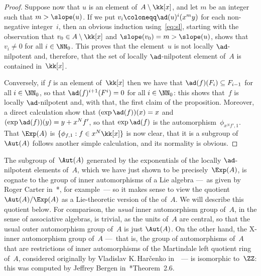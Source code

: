 \begin{proof}
Suppose now that $u$ is an element of~$A\setminus\kk[x]$, and let $m$ be an
integer such that $m>\slope(u)$. If we put $v_i\coloneqq\ad(u)^i(x^my)$ for
each non-negative integer~$i$, then an obvious induction
using~\eqref{eq:sl}, starting with the observation that $v_0\in
A\setminus\kk[x]$ and $\slope(v_0)=m>\slope(u)$, shows that $v_i\neq0$ for
all $i\in\NN_0$. This proves that the element~$u$ is not locally
$\ad$-nilpotent and, therefore, that the set of locally $\ad$-nilpotent
element of~$A$ is contained in~$\kk[x]$.

Conversely, if $f$ is an element of~$\kk[x]$ then we have that
$\ad(f)(F_i)\subseteq F_{i-1}$ for all $i\in\NN_0$, so that
$\ad(f)^{i+1}(F^i)=0$ for all $i\in\NN_0$: this shows that~$f$ is locally
$\ad$-nilpotent and, with that, the first claim of the proposition.
Moreover, a direct calculation show that $(\exp\ad(f))(x)=x$ and
$(\exp\ad(f))(y)=y+x^Nf'$, so that $\exp\ad(f)$ is the
automorphism~$\phi_{x^Nf',1}$. That $\Exp(A)$ is $\{\phi_{f,1}:f\in
x^N\kk[x]\}$ is now clear, that it is a subgroup of~$\Aut(A)$ follows
another simple calculation, and its normality is obvious.
\end{proof}

The subgroup of~$\Aut(A)$ generated by the exponentials of the locally
$\ad$-nilpotent elements of~$A$, which we have just shown to be
precisely~$\Exp(A)$, is cognate to the group of inner automorphisms of a
Lie algebra ---~as given by Roger Carter in~\cite{Carter}*{}, for
example~--- so it makes sense to view the quotient $\Aut(A)/\Exp(A)$ as a
Lie-theoretic version of the  of~$A$. We
will describe this quotient below. For comparison, the \emph{usual} inner
automorphism group of~$A$, in the sense of associative algebras, is
trivial, as the units of~$A$ are central, so that the usual outer
automorphism group of~$A$ is just $\Aut(A)$. On the other hand, the X-inner
automorphism group of~$A$ ---~that is, the group of automorphisms of~$A$
that are restrictions of inner automorphisms of the Martindale left
quotient ring of~$A$, considered originally by Vladislav K.\,Har\v{c}enko
in~~--- is isomorphic
to~$\ZZ$: this was computed by Jeffrey Bergen in~\cite{Bergen}*{Theorem~2.6}. 

